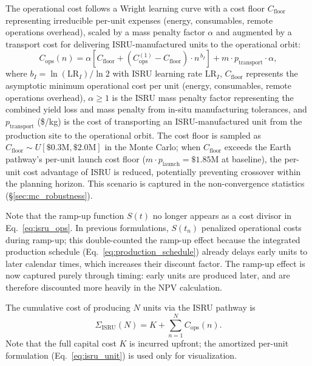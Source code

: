 \documentclass[preprint,12pt]{elsarticle}
\begin{document}
The operational cost follows a Wright learning curve with a cost floor $C_{\mathrm{floor}}$ representing irreducible per-unit expenses (energy, consumables, remote operations overhead), scaled by a mass penalty factor $\alpha$ and augmented by a transport cost for delivering ISRU-manufactured units to the operational orbit:
\begin{equation}
  C_{\mathrm{ops}}(n) = \alpha \left[ C_{\mathrm{floor}} + \left(C_{\mathrm{ops}}^{(1)} - C_{\mathrm{floor}}\right) \cdot n^{\,b_I} \right] + m \cdot p_{\mathrm{transport}} \cdot \alpha,
  \label{eq:isru_ops}
\end{equation}
where $b_I = \ln(\mathrm{LR}_I)/\ln 2$ with ISRU learning rate $\mathrm{LR}_I$, $C_{\mathrm{floor}}$ represents the asymptotic minimum operational cost per unit (energy, consumables, remote operations overhead), $\alpha \geq 1$ is the ISRU mass penalty factor representing the combined yield loss and mass penalty from in-situ manufacturing tolerances, and $p_{\mathrm{transport}}$ (\$/kg) is the cost of transporting an ISRU-manufactured unit from the production site to the operational orbit. The cost floor is sampled as $C_{\mathrm{floor}} \sim U[\$0.3\text{M}, \$2.0\text{M}]$ in the Monte Carlo; when $C_{\mathrm{floor}}$ exceeds the Earth pathway's per-unit launch cost floor ($m \cdot p_{\mathrm{launch}} = \$1.85$M at baseline), the per-unit cost advantage of ISRU is reduced, potentially preventing crossover within the planning horizon. This scenario is captured in the non-convergence statistics (\S\ref{sec:mc_robustness}).

Note that the ramp-up function $S(t)$ no longer appears as a cost divisor in Eq.~\ref{eq:isru_ops}. In previous formulations, $S(t_n)$ penalized operational costs during ramp-up; this double-counted the ramp-up effect because the integrated production schedule (Eq.~\ref{eq:production_schedule}) already delays early units to later calendar times, which increases their discount factor. The ramp-up effect is now captured purely through timing: early units are produced later, and are therefore discounted more heavily in the NPV calculation.

The cumulative cost of producing $N$ units via the ISRU pathway is
\begin{equation}
  \Sigma_{\mathrm{ISRU}}(N) = K + \sum_{n=1}^{N} C_{\mathrm{ops}}(n).
  \label{eq:isru_cum}
\end{equation}
Note that the full capital cost $K$ is incurred upfront; the amortized per-unit formulation (Eq.~\ref{eq:isru_unit}) is used only for visualization.
\end{document}
